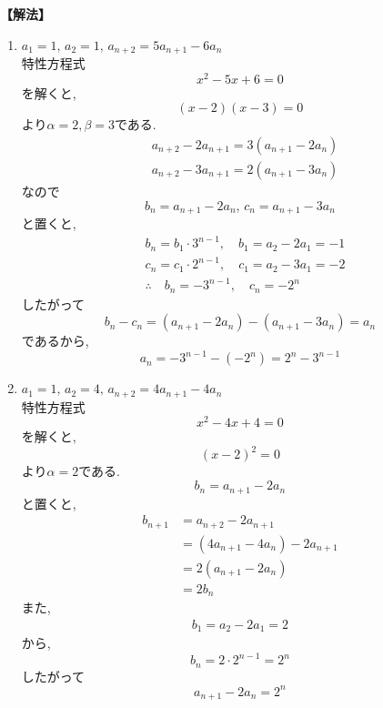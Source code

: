     \noindent\textbf{【解法】}
    \begin{enumerate}[label=(\arabic*),parsep=3pt]
      \item $\displaystyle a_1=1,\,a_2=1,\, a_{n+2}=5a_{n+1}-6a_n$\\
            特性方程式
            \[
              x^2-5x+6=0
            \]
            を解くと,
            \[
              (x-2)(x-3)=0
            \]
            より$\alpha=2,\beta=3$である.
            \begin{align*}
              &a_{n+2}-2a_{n+1}=3(a_{n+1}-2a_n)\\
              &a_{n+2}-3a_{n+1}=2(a_{n+1}-3a_n)
            \end{align*}
            なので
            \[
              b_n=a_{n+1}-2a_n,\,c_n=a_{n+1}-3a_n
            \]
            と置くと,
            \begin{align*}
              &b_n=b_1\cdot3^{n-1},\quad b_1=a_2-2a_1=-1\\
              &c_n=c_1\cdot2^{n-1},\quad c_1=a_2-3a_1=-2\\
              &\therefore \quad b_n=-3^{n-1},\quad c_n=-2^n
            \end{align*}
            したがって
            \[
              b_n-c_n=(a_{n+1}-2a_n)-(a_{n+1}-3a_n)=a_n
            \]
            であるから,
            \[
              a_n=-3^{n-1}-(-2^n)=2^n-3^{n-1}
            \]
      \item $\displaystyle a_1=1,\,a_2=4,\, a_{n+2}=4a_{n+1}-4a_n$\\
            特性方程式
            \[
              x^2-4x+4=0
            \]
            を解くと,
            \[
              (x-2)^2=0
            \]
            より$\alpha=2$である.
            \[
              b_n=a_{n+1}-2a_n
            \]
            と置くと,
            \begin{align*}
              b_{n+1}&=a_{n+2}-2a_{n+1}\\
              &=(4a_{n+1}-4a_n)-2a_{n+1}\\
              &=2(a_{n+1}-2a_n)\\
              &=2b_n
            \end{align*}
            また,
            \begin{align*}
              b_1=a_2-2a_1=2
            \end{align*}
            から,
            \[
              b_n=2\cdot2^{n-1}=2^n
            \]
            したがって
            \[
              a_{n+1}-2a_n=2^n
\]
\end{enumerate}
